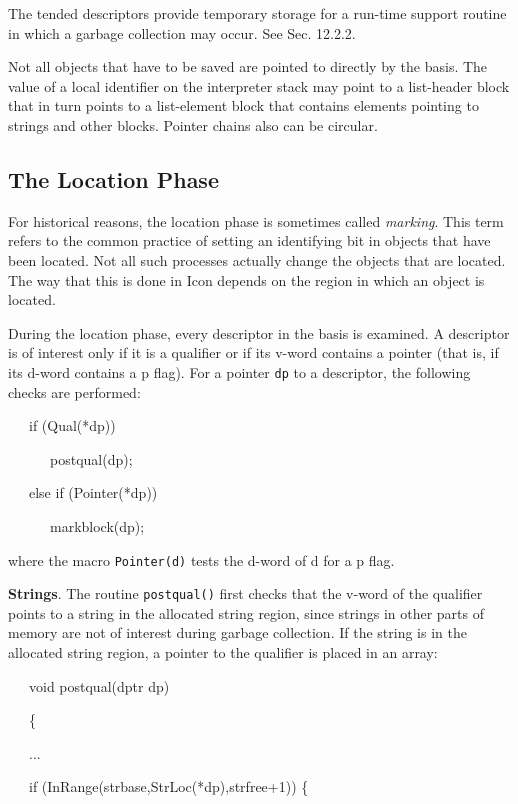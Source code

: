 The tended descriptors provide temporary storage for a run-time
support routine in which a garbage collection may occur. See Sec. 12.2.2.

Not all objects that have to be saved are pointed to directly by the
basis. The value of a local identifier on the interpreter stack may
point to a list-header block that in turn points to a list-element
block that contains elements pointing to strings and other
blocks. Pointer chains also can be circular.

\subsection{The Location Phase}

For historical reasons, the location phase is sometimes called
\textit{marking}. This term refers to the common practice of setting
an identifying bit in objects that have been located. Not all such
processes actually change the objects that are located. The way that
this is done in Icon depends on the region in which an object is
located.

During the location phase, every descriptor in the basis is
examined. A descriptor is of interest only if it is a qualifier or if
its v-word contains a pointer (that is, if its d-word contains a p
flag). For a pointer \texttt{dp} to a descriptor, the following checks
are performed:

{\ttfamily\mdseries
\ \ \ if (Qual(*dp))}

{\ttfamily\mdseries
\ \ \ \ \ \ postqual(dp);}

{\ttfamily
\ \ \ else if (Pointer(*dp))}

{\ttfamily\mdseries
\ \ \ \ \ \ markblock(dp);}

\noindent
where the macro \texttt{Pointer(d)} tests the d-word of d for a p flag.

\textbf{Strings}. The routine \texttt{postqual()} first checks that
the v-word of the qualifier points to a string in the allocated string
region, since strings in other parts of memory are not of interest
during garbage collection. If the string is in the allocated string
region, a pointer to the qualifier is placed in an array:

{\ttfamily\mdseries
\ \ \ void postqual(dptr dp)}

{\ttfamily\mdseries
\ \ \ \{}

{\ttfamily\mdseries
\ \ \ ...}

{\ttfamily\mdseries
\ \ \ if (InRange(strbase,StrLoc(*dp),strfree+1)) \{}

